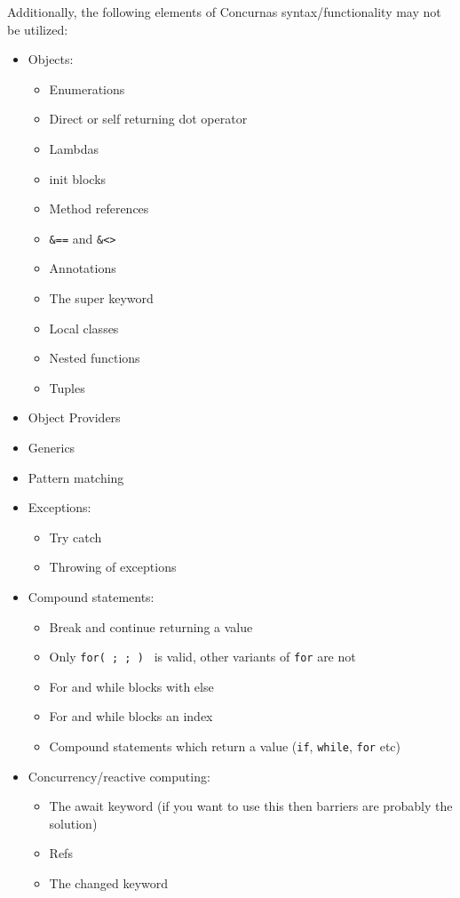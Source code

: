 \documentclass[conc-doc]{subfiles}
\begin{document}
Additionally, the following elements of Concurnas syntax/functionality may not be utilized:
\begin{itemize}
	\item Objects:
	\begin{itemize}
		\item Enumerations
		\item Direct or self returning dot operator
		\item Lambdas
		\item init blocks
		\item Method references
		\item \lstinline{&==} and \lstinline{&<>}
		\item Annotations
		\item The super keyword
		\item Local classes
		\item Nested functions
		\item Tuples
	\end{itemize}
	\item Object Providers
	\item Generics
	\item Pattern matching
	\item Exceptions:
	\begin{itemize}
		\item Try catch
		\item Throwing of exceptions
	\end{itemize}
	\item Compound statements:
	\begin{itemize}
		\item Break and continue returning a value
		\item Only \lstinline{for( ; ; ) } is valid, other variants of \lstinline{for} are not
		\item For and while blocks with else
		\item For and while blocks an index
		\item Compound statements which return a value (\lstinline{if}, \lstinline{while}, \lstinline{for} etc)
	\end{itemize}
	\item Concurrency/reactive computing:
	\begin{itemize}
		\item The await keyword (if you want to use this then barriers are probably the solution)
		\item Refs
		\item The changed keyword

\end{itemize}
\end{itemize}
\end{document}
